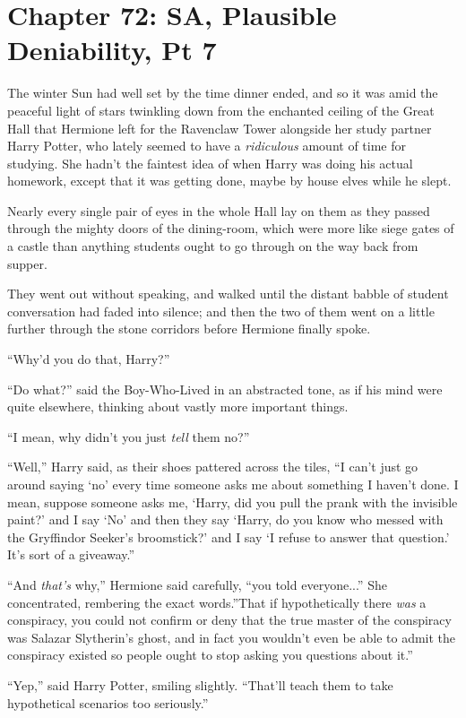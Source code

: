 \chapter{Chapter 72: SA, Plausible Deniability, Pt 7}
The winter Sun had well set by the time dinner ended, and so it was amid
the peaceful light of stars twinkling down from the enchanted ceiling of
the Great Hall that Hermione left for the Ravenclaw Tower alongside her
study partner Harry Potter, who lately seemed to have a
\emph{ridiculous} amount of time for studying. She hadn't the faintest
idea of when Harry was doing his actual homework, except that it was
getting done, maybe by house elves while he slept.

Nearly every single pair of eyes in the whole Hall lay on them as they
passed through the mighty doors of the dining-room, which were more like
siege gates of a castle than anything students ought to go through on
the way back from supper.

They went out without speaking, and walked until the distant babble of
student conversation had faded into silence; and then the two of them
went on a little further through the stone corridors before Hermione
finally spoke.

``Why'd you do that, Harry?''

``Do what?'' said the Boy-Who-Lived in an abstracted tone, as if his
mind were quite elsewhere, thinking about vastly more important things.

``I mean, why didn't you just \emph{tell} them no?''

``Well,'' Harry said, as their shoes pattered across the tiles, ``I
can't just go around saying `no' every time someone asks me about
something I haven't done. I mean, suppose someone asks me, `Harry, did
you pull the prank with the invisible paint?' and I say `No' and then
they say `Harry, do you know who messed with the Gryffindor Seeker's
broomstick?' and I say `I refuse to answer that question.' It's sort of
a giveaway.''

``And \emph{that's} why,'' Hermione said carefully, ``you told
everyone...'' She concentrated, rembering the exact words.''That if
hypothetically there \emph{was} a conspiracy, you could not confirm or
deny that the true master of the conspiracy was Salazar Slytherin's
ghost, and in fact you wouldn't even be able to admit the conspiracy
existed so people ought to stop asking you questions about it.''

``Yep,'' said Harry Potter, smiling slightly. ``That'll teach them to
take hypothetical scenarios too seriously.''

